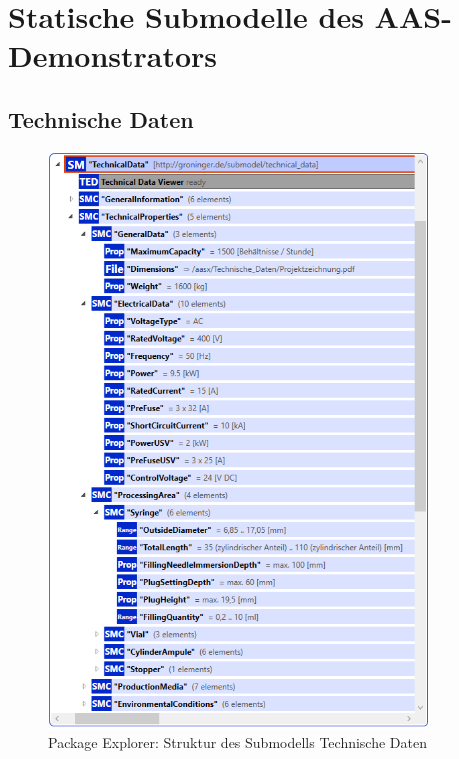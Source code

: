 \newpage
\section{Statische Submodelle des AAS-Demonstrators}
\label{sec:AnhangSubmodelle}
\subsection{Technische Daten}
\label{subsec:TechnischeDaten}
\begin{figure}[H]
    \centering
        \includegraphics[width=0.9\textwidth]{Bilder/ErgebnissePackageExplorer/TehcnischeDaten.PNG}
    \caption{Package Explorer: Struktur des Submodells Technische Daten}
    \label{fig:SMTechnischeDaten}
\end{figure}
\newpage

